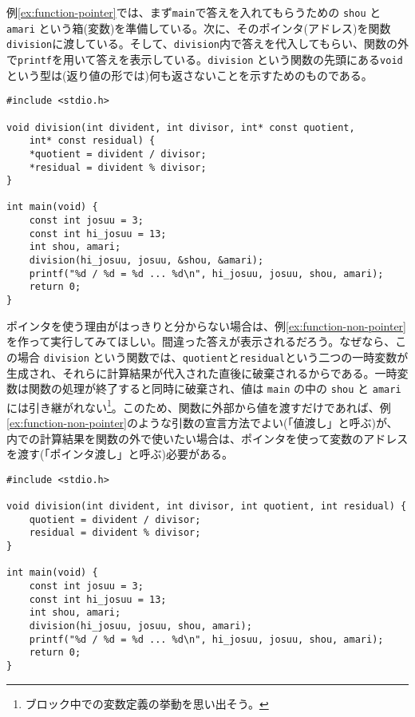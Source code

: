 例\ref{ex:function-pointer}では、まず\texttt{main}で答えを入れてもらうための \texttt{shou} と \texttt{amari} という箱(変数)を準備している。次に、そのポインタ(アドレス)を関数\texttt{division}に渡している。そして、\texttt{division}内で答えを代入してもらい、関数の外で\texttt{printf}を用いて答えを表示している。\texttt{division} という関数の先頭にある\texttt{void}という型は(返り値の形では)何も返さないことを示すためのものである。
\begin{reidai}\label{ex:function-pointer}
    \begin{verbatim}
#include <stdio.h>

void division(int divident, int divisor, int* const quotient,
    int* const residual) {
    *quotient = divident / divisor;
    *residual = divident % divisor;
}

int main(void) {
    const int josuu = 3;
    const int hi_josuu = 13;
    int shou, amari;
    division(hi_josuu, josuu, &shou, &amari);
    printf("%d / %d = %d ... %d\n", hi_josuu, josuu, shou, amari);
    return 0;
}
\end{verbatim}
\end{reidai} \noindent
ポインタを使う理由がはっきりと分からない場合は、例\ref{ex:function-non-pointer}を作って実行してみてほしい。間違った答えが表示されるだろう。なぜなら、この場合 \texttt{division} という関数では、\texttt{quotient}と\texttt{residual}という二つの一時変数が生成され、それらに計算結果が代入された直後に破棄されるからである。一時変数は関数の処理が終了すると同時に破棄され、値は \texttt{main} の中の \texttt{shou} と \texttt{amari} には引き継がれない\footnote{ブロック中での変数定義の挙動を思い出そう。}。このため、関数に外部から値を渡すだけであれば、例\ref{ex:function-non-pointer}のような引数の宣言方法でよい(「値渡し」と呼ぶ)が、内での計算結果を関数の外で使いたい場合は、ポインタを使って変数のアドレスを渡す(「ポインタ渡し」と呼ぶ)必要がある。
\begin{reidai}\label{ex:function-non-pointer}
    \begin{verbatim}
#include <stdio.h>

void division(int divident, int divisor, int quotient, int residual) {
    quotient = divident / divisor;
    residual = divident % divisor;
}

int main(void) {
    const int josuu = 3;
    const int hi_josuu = 13;
    int shou, amari;
    division(hi_josuu, josuu, shou, amari);
    printf("%d / %d = %d ... %d\n", hi_josuu, josuu, shou, amari);
    return 0;
}
\end{verbatim}
\end{reidai}

